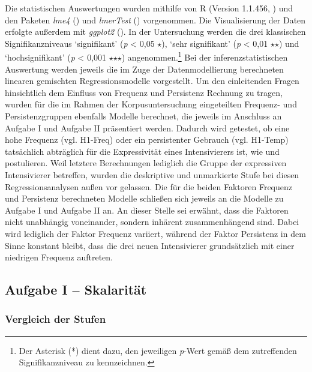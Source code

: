 Die statistischen Auswertungen wurden mithilfe von R ({Version 1.1.456}, \mbox{\citealt[]{R.2018}}) und den Paketen \textit{lme4} (\citealt[]{Bates.2015}) und \textit{lmerTest} ({\citealt[]{Kuznetsova.2017}}) vorgenommen. Die Visualisierung der Daten erfolgte außerdem mit \textit{ggplot2} ({\citealt[]{Wickham.2016}}). In der Untersuchung werden die drei klassischen Signifikanzniveaus `signifikant' ({\textit{p} < 0,05 $\star$}), `sehr signifikant' (\textit{p} < 0,01 $\star$$\star$) und `hochsignifikant' (\textit{p} < 0,001 $\star$$\star$$\star$) angenommen.\footnote{Der Asterisk (*) dient dazu, den jeweiligen \textit{p}-Wert gemäß dem zutreffenden Signifikanzniveau zu kennzeichnen.}
Bei der inferenzstatistischen Auswertung werden jeweils die im Zuge der Datenmodellierung berechneten linearen gemischten Regressionsmodelle vorgestellt. Um den einleitenden Fragen hinsichtlich dem Einfluss von Frequenz und Persistenz Rechnung zu tragen, wurden für die im Rahmen der Korpusuntersuchung eingeteilten Frequenz- und Persistenzgruppen ebenfalls Modelle berechnet, die jeweils im Anschluss an Aufgabe I und {Aufgabe II} präsentiert werden. Dadurch wird getestet, ob eine hohe Frequenz (vgl. H1-Freq) oder ein persistenter Gebrauch (vgl. H1-Temp) tatsächlich abträglich für die Expressivität eines Intensivierers ist, wie \citet[2]{Hauschild.1899} und {\citet[59]{Tobler.1868}} postulieren. Weil letztere Berechnungen lediglich die Gruppe der expressiven Intensivierer betreffen, wurden die deskriptive und unmarkierte Stufe bei diesen Regressionsanalysen außen vor gelassen. Die für die beiden Faktoren Frequenz und Persistenz berechneten Modelle schließen sich jeweils an die Modelle zu Aufgabe I und Aufgabe II an. An dieser Stelle sei erwähnt, dass die Faktoren nicht unabhängig voneinander, sondern inhärent zusammenhängend sind. Dabei wird lediglich der Faktor Frequenz variiert, während der Faktor Persistenz in dem Sinne konstant bleibt, dass die drei neuen Intensivierer grundsätzlich mit einer niedrigen Frequenz auftreten.








\subsection{Aufgabe I -- Skalarität} \label{abs:VP-Vergleich1251}


\subsubsection{Vergleich der Stufen} \label{abs:I-Vergleich254}


